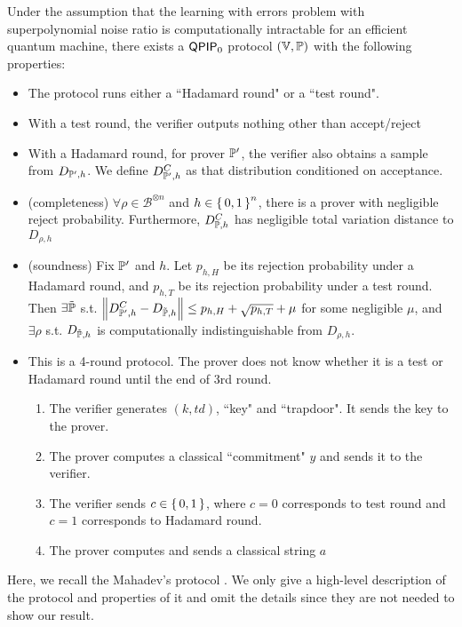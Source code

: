 \begin{theorem}
    \label{Mahadev_QPIP0_Protocol_Interface}
	Under the assumption that the learning with errors problem with superpolynomial noise ratio is computationally intractable for an efficient quantum machine, there exists a $\operatorname{\mathsf{QPIP}}_0$ protocol $(\mathbb{V}, \mathbb{P})$ with the following properties:
	\begin{itemize}
	    \item The protocol runs either a ``Hadamard round" or a ``test round".
	    \item With a test round, the verifier outputs nothing other than accept/reject
	    \item With a Hadamard round, for prover $\mathbb{P}'$, the verifier also obtains a sample from $D_{\mathbb{P}', h}$. We define $D^C_{\mathbb{P}', h}$ as that distribution conditioned on acceptance.
	    \item (completeness) $\forall\rho\in\mathcal{B}^{\otimes n}$ and $h\in\set{0,1}^n$, there is a prover with negligible reject probability. Furthermore, $D^C_{\mathbb{P}, h}$ has negligible total variation distance to $D_{\rho, h}$
	    \item (soundness) Fix $\mathbb{P}'$ and $h$. Let $p_{h, H}$ be its rejection probability under a Hadamard round, and $p_{h, T}$ be its rejection probability under a test round. Then $\exists\tilde{\mathbb{P}}$ s.t. $\left\lVert D^C_{\mathbb{P}', h} - D_{\tilde{\mathbb{P}}, h}\right\rVert\leq p_{h,H} + \sqrt{p_{h, T}}+\mu$ for some negligible $\mu$, and $\exists\rho$ s.t. $D_{\tilde{\mathbb{P}}, h}$ is computationally indistinguishable from $D_{\rho, h}$.
		\item This is a 4-round protocol. The prover does not know whether it is a test or Hadamard round until the end of 3rd round.
		\begin{enumerate}
			\item The verifier generates $(k, td)$, ``key" and ``trapdoor". It sends the key to the prover.
			\item The prover computes a classical ``commitment" $y$ and sends it to the verifier.
			\item The verifier sends $c\in\set{0, 1}$, where $c=0$ corresponds to test round and $c=1$ corresponds to Hadamard round.
			\item The prover computes and sends a classical string $a$
		\end{enumerate}
	\end{itemize}
\end{theorem}

Here, we recall the Mahadev's protocol \cite{FOCS:Mahadev18a}. We only give a high-level description of the protocol and properties of it and omit the details since they are not needed to show our result. 

